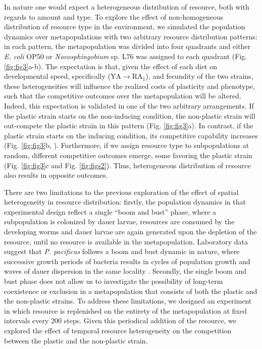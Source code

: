 \documentclass[10pt,letterpaper]{article}
\newcommand{\ecoli}{\emph{E. coli} OP50}
\newcommand{\novo}{\emph{Novosphingobium} sp. L76}
\newcommand{\ppac}{\emph{P. pacificus}}
\begin{document}
\hspace{5cm}

In nature one would expect a heterogeneous distribution of resource, both with regards to amount and type. To explore the effect of non-homogeneous distribution of resource type in the environment, we simulated the population dynamics over metapopulations with two arbitrary resource distribution patterns: in each pattern, the metapopulation was divided into four quadrants and either \ecoli{} or \novo{} was assigned to each quadrant (Fig.\ref{fig:fig3}a-b). The expectation is that, given the effect of each diet on developmental speed, specifically ($\mathrm{YA} \rightarrow \mathrm{RA}_1$), and fecundity of the two strains, these heterogeneities will influence the realized costs of plasticity and phenotype, such that the competitive outcomes over the metapopulation will be altered. Indeed, this expectation is validated in one of the two arbitrary arrangements. If the plastic strain starts on the non-inducing condition, the non-plastic strain will out-compete the plastic strain in this pattern (Fig. \ref{fig:fig3}a). In contrast, if the plastic strain starts on the inducing condition, its competitive capability increases (Fig. \ref{fig:fig3}b, ). Furthermore, if we assign resource type to subpopulations at random, different competitive outcomes emerge, some favoring the plastic strain (Fig. \ref{fig:fig3}c and Fig. \ref{fig:figs2}). Thus, heterogeneous distribution of resource also results in opposite outcomes. 

\hspace{5cm}

There are two limitations to the previous exploration of the effect of spatial heterogeneity in resource distribution: firstly, the population dynamics in that experimental design reflect a single ``boom and bust'' phase, where a subpopulation is colonized by dauer larvae, resources are consumed by the developing worms and dauer larvae are again generated upon the depletion of the resource, until no resource is available in the metapopulation. Laboratory data suggest that \ppac{} follows a boom and bust dynamic in nature, where successive growth periods of bacteria results in cycles of population growth and waves of dauer dispersion in the same locality \cite{Renahan2021aa}. Secondly, the single boom and bust phase does not allow us to investigate the possibility of long-term coexistence or exclusion in a metapopulation that consists of both the plastic and the non-plastic strains. To address these limitations, we designed an experiment in which resource is replenished on the entirety of the metapopulation at fixed intervals every $200$ steps. Given this periodical addition of the resource, we explored the effect of temporal resource heterogeneity on the competition between the plastic and the non-plastic strain. 
\end{document}
